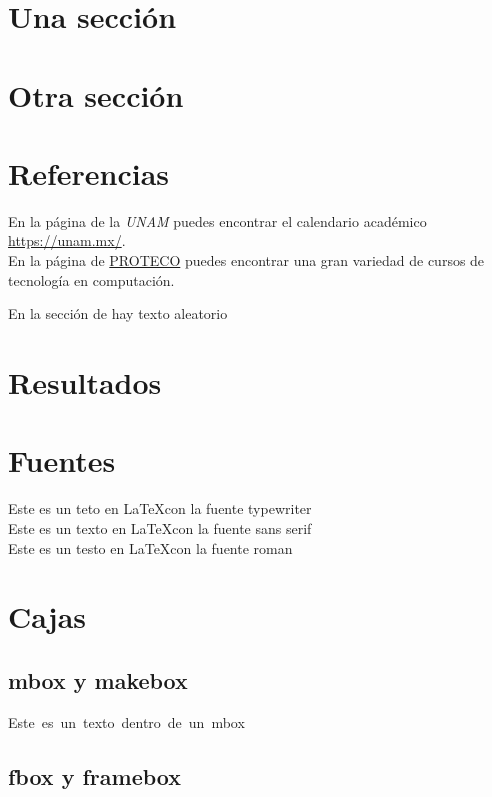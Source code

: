 \documentclass{article}
\begin{document}
	
	\section{Una sección} \label{UnaSeccioon}
	\lipsum
	\section{Otra sección}
	\lipsum
	
	\section{Referencias}
	En la página de la \textit{UNAM} puedes encontrar el calendario académico \\\url{https://unam.mx/}.\\ En la página de
	\textcolor{myBlue}{\href{https://proteco.mx}{PROTECO}}
	puedes encontrar una gran variedad de cursos de tecnología en computación.
	
	En la sección de \textcolor{myBlue}{} hay texto aleatorio
	
	\section{Resultados}\label{Resultados}
	\lipsum
	
	\section{Fuentes}
	\ttfamily Este es un teto en \LaTeX con la fuente typewriter\\
	\sffamily Este es un texto en \LaTeX con la fuente sans serif\\
	\rmfamily Este es un testo en \LaTeX con la fuente roman
	
	\section{Cajas}
	\subsection{mbox y makebox}
	\mbox{Este es un texto dentro de un mbox}\\
	
	\subsection{fbox y framebox}
	\\
	
\end{document}
